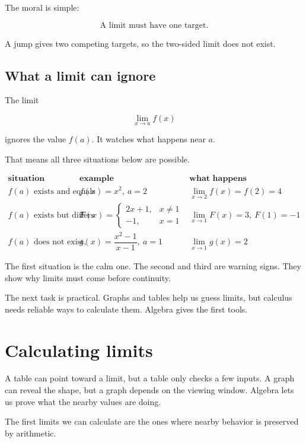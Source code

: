 The moral is simple:

\[
\boxed{\text{A limit must have one target.}}
\]

A jump gives two competing targets, so the two-sided limit does not exist.

\subsection{What a limit can ignore}
\label{subsec:what-limit-can-ignore}

The limit

\[
\lim_{x\to a}f(x)
\]

ignores the value \(f(a)\).  It watches what happens near \(a\).

That means all three situations below are possible.

\[
\begin{array}{c|c|c}
\textbf{situation} & \textbf{example} & \textbf{what happens} \\ \hline
f(a)\text{ exists and equals the limit} & f(x)=x^2,\ a=2 & \lim_{x\to2}f(x)=f(2)=4 \\[3pt]
f(a)\text{ exists but differs from the limit} &
F(x)=
\begin{cases}
2x+1,&x\neq1\\
-1,&x=1
\end{cases}
&
\lim_{x\to1}F(x)=3,\ F(1)=-1 \\[12pt]
f(a)\text{ does not exist, but the limit exists} &
g(x)=\dfrac{x^2-1}{x-1},\ a=1
&
\lim_{x\to1}g(x)=2
\end{array}
\]

The first situation is the calm one.  The second and third are warning signs.  They show why limits must come before continuity.

The next task is practical.  Graphs and tables help us guess limits, but calculus needs reliable ways to calculate them.  Algebra gives the first tools.

\section{Calculating limits}
\label{sec:calculating-limits}

A table can point toward a limit, but a table only checks a few inputs.  A graph can reveal the shape, but a graph depends on the viewing window.  Algebra lets us prove what the nearby values are doing.

The first limits we can calculate are the ones where nearby behavior is preserved by arithmetic.

